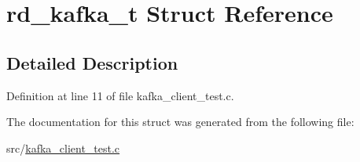 \hypertarget{structrd__kafka__t}{\section{rd\-\_\-kafka\-\_\-t \-Struct \-Reference}
\label{structrd__kafka__t}
}


\subsection{\-Detailed \-Description}


\-Definition at line 11 of file kafka\-\_\-client\-\_\-test.\-c.



\-The documentation for this struct was generated from the following file\-:\begin{DoxyCompactItemize}
\item 
src/\hyperlink{kafka__client__test_8c}{kafka\-\_\-client\-\_\-test.\-c}\end{DoxyCompactItemize}
